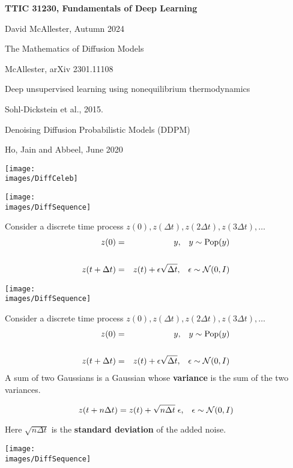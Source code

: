 





{\Huge

  \centerline{\bf TTIC 31230, Fundamentals of Deep Learning}
  \bigskip
  \centerline{David McAllester, Autumn 2024}
  \vfill
  \vfil
  \centerline{The Mathematics of Diffusion Models}
  \vfill
  \centerline{McAllester, arXiv 2301.11108}
    \vfill
  \vfill


\centerline{Deep unsupervised learning using nonequilibrium thermodynamics}
\centerline{Sohl-Dickstein et al., 2015.}

\vfill
\centerline{Denoising Diffusion Probabilistic Models (DDPM)}
\centerline{Ho, Jain and Abbeel, June 2020}


\vfill
\centerline{\texttt{[image: \\images/DiffCeleb]}}

\centerline{\texttt{[image: \\images/DiffSequence]}}

\vfill
Consider a discrete time process $z(0),z(\Delta t),z(2\Delta t),z(3\Delta t),\ldots$
{\huge
\begin{eqnarray*}
  z(0) & = & y,\;\;\;y \sim \mathrm{Pop}(y) \\
  \\
  z(t+\Delta t) & = & z(t) + \epsilon\sqrt{\Delta t},\;\;\;\epsilon \sim {\cal N}(0,I)
\end{eqnarray*}
}

\centerline{\texttt{[image: \\images/DiffSequence]}}

Consider a discrete time process $z(0),z(\Delta t),z(2\Delta t),z(3\Delta t),\ldots$
{\huge
\begin{eqnarray*}
  z(0) & = & y,\;\;\;y \sim \mathrm{Pop}(y) \\
  \\
  z(t+\Delta t) & = & z(t) + \epsilon\sqrt{\Delta t},\;\;\;\epsilon \sim {\cal N}(0,I)
\end{eqnarray*}
}
A sum of two Gaussians is a Gaussian whose {\bf variance} is the sum of the two variances.

\vfill
$$z(t+n\Delta t) = z(t) + \sqrt{n\Delta t}\; \epsilon,\;\;\;\epsilon \sim {\cal N}(0,I)$$

\vfill
Here $\sqrt{n \Delta t}$ is the {\bf standard deviation} of the added noise.



\centerline{\texttt{[image: \\images/DiffSequence]}}

}
